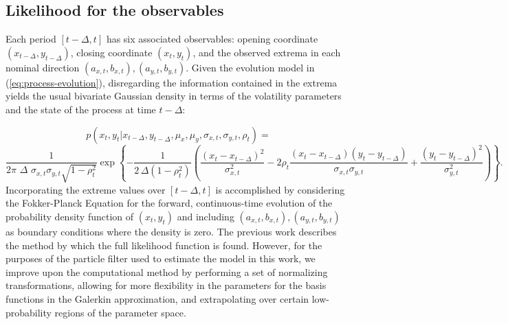 \documentclass[10pt]{article}
\begin{document}
\subsection{Likelihood for the observables}
Each period $[t-\Delta,t]$ has six associated observables: opening
coordinate $(x_{t-\Delta},y_{t-\Delta})$, closing coordinate
$(x_{t},y_{t})$, and the observed extrema in each nominal direction
$(a_{x,t}, b_{x,t}), (a_{y,t},b_{y,t})$. Given the evolution model in
(\ref{eq:process-evolution}), disregarding the information contained in
the extrema yields the usual bivariate Gaussian density in terms of
the volatility parameters and the state of the process at time $t-\Delta$: 

\[
  p(x_t,y_t| x_{t-\Delta}, y_{t-\Delta}, \mu_x, \mu_y, \sigma_{x,t}, \sigma_{y,t}, \rho_t) =
\]
\[
  \frac{1}{2\pi\,\,\Delta\,\,
    \sigma_{x,t}\sigma_{y,t}\sqrt{1-\rho_t^2}} \exp\left\{
    -\frac{1}{2\,\Delta(1-\rho_t^2)} \left( \frac{(x_t -
        x_{t-\Delta})^2}{\sigma_{x,t}^2} - 2\rho_t
      \frac{(x_{t}-x_{t-\Delta})(y_t-y_{t-\Delta})}{\sigma_{x,t}\sigma_{y,t}}
      + \frac{(y_t - y_{t-\Delta})^2}{\sigma_{y,t}^2}\right) \right\}.
\]
Incorporating the extreme values over $[t-\Delta,t]$ is accomplished
by considering the Fokker-Planck Equation for the forward,
continuous-time evolution of the probability density function of
$(x_t, y_t)$ and including $(a_{x,t}, b_{x,t}), (a_{y,t},b_{y,t})$ as
boundary conditions where the density is zero. The previous work
describes the method by which the full likelihood function is
found. However, for the purposes of the particle filter used to
estimate the model in this work, we improve upon the computational
method by performing a set of normalizing transformations, allowing
for more flexibility in the parameters for the basis functions in the
Galerkin approximation, and extrapolating over certain low-probability
regions of the parameter space.
\end{document}
